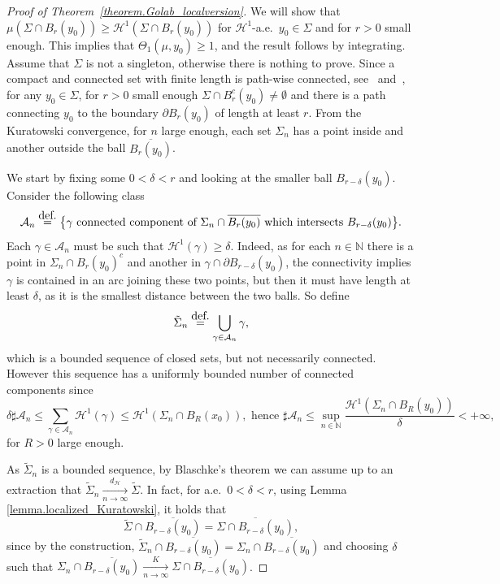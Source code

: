 \documentclass[11pt]{article}
\numberwithin{equation}{section}
\theoremstyle{definition}
\newcommand{\eqdef}{\ensuremath{\stackrel{\mbox{\upshape\tiny def.}}{=}}}
\newcommand\cH{\mathcal{H}}
\newcommand{\distH}{d_{\mathcal{H}}}
\begin{document}
\begin{proof}[Proof of Theorem~\ref{theorem.Golab_localversion}]
We will show that $\mu(\Sigma \cap B_r(y_0)) \ge \cH^1(\Sigma \cap B_r(y_0))$ for $\cH^1$\nobreakdash-a.e.\ $y_0\in \Sigma$ and for $r>0$ small enough. This implies that $\Theta_1(\mu, y_0) \ge 1$, and the result follows by integrating. Assume that $\Sigma$ is not a singleton, otherwise there is nothing to prove. Since a compact and connected set with finite length is path-wise connected, see~\cite[Prop.\,30.1 \& Cor.\,30.2]{david2006singular} and~\cite[Th.\,4.4]{alberti2017structure}, for any $y_0 \in \Sigma$, for $r>0$ small enough $\Sigma \cap B_r^c(y_0) \neq \emptyset$ and there is a path connecting $y_0$ to the boundary $\partial B_r(y_0)$ of length at least $r$. From the Kuratowski convergence, for $n$ large enough, each set $\Sigma_n$ has a point inside and another outside the ball $\overline{B_r(y_0)}$.

We start by fixing some $0< \delta < r$ and looking at the smaller ball $B_{r-\delta}(y_0)$. Consider the following class
\[
\mathcal{A}_n
\eqdef
\bigl\{
\gamma \text{ connected component of $\Sigma_n\cap \overline{B_r(y_0)}$ which intersects $B_{r-\delta}(y_0)$}
\bigr\}.
\]
Each $\gamma \in \mathcal{A}_n$ must be such that $\cH^1(\gamma) \ge \delta$. Indeed, as for each $n \in \mathbb{N}$ there is a point in $\Sigma_n\cap B_r(y_0)^c$ and another in $\gamma \cap \partial B_{r-\delta}(y_0)$, the connectivity implies $\gamma$ is contained in an arc joining these two points, but then it must have length at least $\delta$, as it is the smallest distance between the two balls. So define
\[
\tilde\Sigma_n \eqdef
\bigcup_{\gamma \in \mathcal{A}_n}
\gamma,
\]
which is a bounded sequence of closed sets, but not necessarily connected. However this sequence has a uniformly bounded number of connected components since
\[
\delta\sharp \mathcal{A}_n
\le
\sum_{\gamma \in \mathcal{A}_n} \cH^1(\gamma)
\le \cH^1(\Sigma_n \cap B_R(x_0)), \text{ hence }
\sharp \mathcal{A}_n
\le \sup_{n \in \mathbb{N}} \frac{\cH^1(\Sigma_n\cap B_R(y_0))}{\delta}
< +\infty,
\]
for $R>0$ large enough.

As $\tilde \Sigma_n$ is a bounded sequence, by Blaschke's theorem we can assume up to an extraction that $\tilde \Sigma_n \xrightarrow[n \to \infty]{\distH} \tilde \Sigma$. In fact, for a.e.\ $0 < \delta < r$, using Lemma \ref{lemma.localized_Kuratowski}, it holds that
\begin{equation}\label{identity}
\tilde \Sigma\cap \overline{B_{r-\delta}(y_0)} = \overline{\Sigma\cap B_{r-\delta}(y_0)},
\end{equation}
since by the construction, $\tilde \Sigma_n\cap \overline{B_{r-\delta}(y_0)} = \Sigma_n\cap \overline{B_{r-\delta}(y_0)}$ and choosing $\delta$ such that $\Sigma_n\cap \overline{B_{r-\delta}(y_0)} \xrightarrow[n \to \infty]{K} \overline{\Sigma\cap B_{r-\delta}(y_0)}$.


\end{proof}
\end{document}
